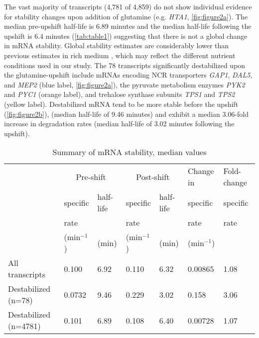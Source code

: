 The vast majority of transcripts (4,781 of 4,859) do not show
individual evidence for stability changes upon addition of glutamine
(e.g. \textit{HTA1}, \autoref{fig:figure2a}). 
The median pre-upshift half-life is 6.89 minutes and the median
half-life following the upshift is 6.4 minutes (\autoref{tab:table1})
suggesting that there is not a global change in mRNA stability.
Global stability estimates are
considerably lower than previous estimates in rich medium
\parencite{munchel2011dynamic,neymotin2014determination,miller2011dynamic}, 
which may reflect the
different nutrient conditions used in our study. 
The 78 transcripts significantly destabilized upon the 
glutamine-upshift include
mRNAs encoding NCR transporters \textit{GAP1}, \textit{DAL5}, and
\textit{MEP2} (blue label, \autoref{fig:figure2a}), the pyruvate metabolism enzymes
\textit{PYK2} and \textit{PYC1} (orange label), and trehalose synthase
subunits \textit{TPS1} and
\textit{TPS2} (yellow label).
Destabilized mRNA tend to be more stable before the upshift
(\autoref{fig:figure2b}),
(median half-life of 9.46 minutes) and exhibit 
a median 3.06-fold increase in degradation rates (median half-life of
3.02 minutes following the upshift). 

\begin{table}[h]
\small
\caption{\label{tab:table1} Summary of mRNA stability, median values}
\begin{tabular}{p{8em} | l | l | l | l | l | l}
& \multicolumn{2}{c}{Pre-shift} & \multicolumn{2}{c}{Post-shift} &
Change in & Fold-change\\
 & specific & half-life & specific  & half-life & specific & specific \\
 & rate & & rate & & rate & rate \\
 & (min$^{-1}$) & (min) & (min$^{-1}$) & (min) & (min$^{-1}$) & \\
\midrule
\raggedright All transcripts & 0.100 & 6.92 & 0.110 & 6.32 & 0.00865 & 1.08\\
\midrule
\raggedright Destabilized (n=78) & 0.0732 & 9.46 & 0.229 & 3.02 & 0.158 & 3.06\\
\midrule
\raggedright Destabilized (n=4781) & 0.101 & 6.89 & 0.108 & 6.40 & 0.00728 & 1.07\\
\bottomrule
\end{tabular}
\end{table}


